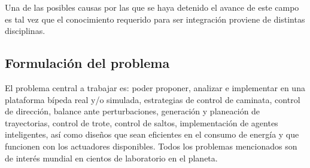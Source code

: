 Una de las posibles causas por las que se haya detenido el avance de este campo es tal vez que el conocimiento requerido para ser integraci\'on proviene de distintas disciplinas.\par

\subsection[Formulaci\'on]{Formulaci\'on del problema}
El problema central a trabajar es: poder proponer, analizar e implementar en una plataforma b\'ipeda real y/o simulada, estrategias de control de caminata, control de direcci\'on, balance ante perturbaciones, generaci\'on y planeaci\'on de trayectorias, control de trote, control de saltos, implementaci\'on de agentes inteligentes, as\'i como dise\~nos que sean eficientes en el consumo de energ\'ia y que funcionen con los actuadores disponibles. Todos los problemas mencionados son de inter\'es mundial en cientos de laboratorio en el planeta.

